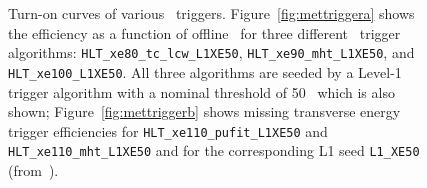 					\begin{figure}[!htb]
						\begin{center}
							\hspace{0.05\textwidth}
						\end{center}
						\caption{Turn-on curves of various \met\ triggers. Figure~\ref{fig:mettriggera} shows the efficiency as a function of offline \met\ for three different \met\ trigger algorithms: \texttt{HLT\_xe80\_tc\_lcw\_L1XE50}, \texttt{HLT\_xe90\_mht\_L1XE50}, and \texttt{HLT\_xe100\_L1XE50}. All three algorithms are seeded by a Level-1 trigger algorithm with a nominal threshold of 50 \GeV\ which is also shown; Figure~\ref{fig:mettriggerb} shows missing transverse energy trigger efficiencies for \texttt{HLT\_xe110\_pufit\_L1XE50} and \texttt{HLT\_xe110\_mht\_L1XE50} and for the corresponding \ac{L1} seed \texttt{L1\_XE50} (from~\cite{ATLASMETTriggerPublicPage}).}
						\label{fig:mettrigger}
					\end{figure}
